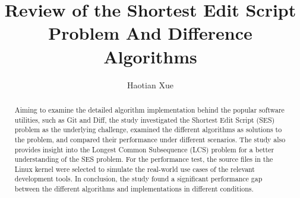 \documentclass[sigplan,screen]{acmart}
\begin{document}
\title{Review of the Shortest Edit Script Problem And Difference Algorithms}

\author{Haotian Xue}

\begin{abstract}
  Aiming to examine the detailed algorithm implementation behind the popular software utilities, such as Git and Diff, the study investigated the Shortest Edit Script (SES) problem as the underlying challenge, examined the different algorithms as solutions to the problem, and compared their performance under different scenarios. The study also provides insight into the Longest Common Subsequence (LCS) problem for a better understanding of the SES problem. 
  For the performance test, the source files in the Linux kernel were selected to simulate the real-world use cases of the relevant development tools. In conclusion, the study found a significant performance gap between the different algorithms and implementations in different conditions.
\end{abstract}


\maketitle

\end{document}
